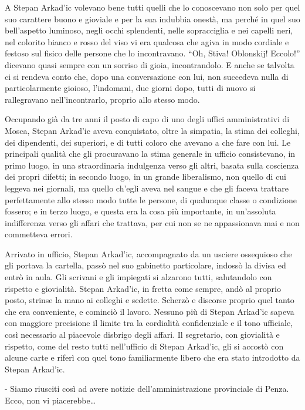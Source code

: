 A Stepan Arkad'ic volevano bene tutti quelli che lo conoscevano non solo per quel suo carattere buono e gioviale e per la sua indubbia onestà, ma perché in quel suo bell'aspetto luminoso, negli occhi splendenti, nelle sopracciglia e nei capelli neri, nel colorito bianco e rosso del viso vi era qualcosa che agiva in modo cordiale e festoso sul fisico delle persone che lo incontravano. ``Oh, Stiva! Oblonskij! Eccolo!'' dicevano quasi sempre con un sorriso di gioia, incontrandolo. E anche se talvolta ci si rendeva conto che, dopo una conversazione con lui, non succedeva nulla di particolarmente gioioso, l'indomani, due giorni dopo, tutti di nuovo si rallegravano nell'incontrarlo, proprio allo stesso modo. 

Occupando già da tre anni il posto di capo di uno degli uffici amministrativi di Mosca, Stepan Arkad'ic aveva conquistato, oltre la simpatia, la stima dei colleghi, dei dipendenti, dei superiori, e di tutti coloro che avevano a che fare con lui. Le principali qualità che gli procuravano la stima generale in ufficio consistevano, in primo luogo, in una straordinaria indulgenza verso gli altri, basata sulla coscienza dei propri difetti; in secondo luogo, in un grande liberalismo, non quello di cui leggeva nei giornali, ma quello ch'egli aveva nel sangue e che gli faceva trattare perfettamente allo stesso modo tutte le persone, di qualunque classe o condizione fossero; e in terzo luogo, e questa era la cosa più importante, in un'assoluta indifferenza verso gli affari che trattava, per cui non se ne appassionava mai e non commetteva errori. 

Arrivato in ufficio, Stepan Arkad'ic, accompagnato da un usciere ossequioso che gli portava la cartella, passò nel suo gabinetto particolare, indossò la divisa ed entrò in aula. Gli scrivani e gli impiegati si alzarono tutti, salutandolo con rispetto e giovialità. Stepan Arkad'ic, in fretta come sempre, andò al proprio posto, strinse la mano ai colleghi e sedette. Scherzò e discorse proprio quel tanto che era conveniente, e cominciò il lavoro. Nessuno più di Stepan Arkad'ic sapeva con maggiore precisione il limite tra la cordialità confidenziale e il tono ufficiale, così necessario al piacevole disbrigo degli affari. Il segretario, con giovialità e rispetto, come del resto tutti nell'ufficio di Stepan Arkad'ic, gli si accostò con alcune carte e riferì con quel tono familiarmente libero che era stato introdotto da Stepan Arkad'ic. 

- Siamo riusciti così ad avere notizie dell'amministrazione provinciale di Penza. Ecco, non vi piacerebbe\ldots{} 

